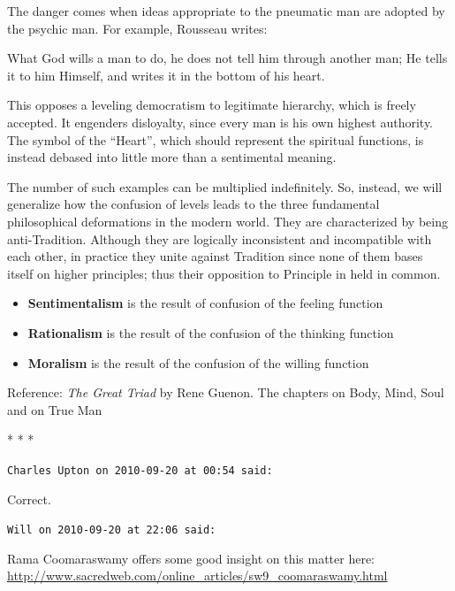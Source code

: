 The danger comes when ideas appropriate to the pneumatic man are adopted by the psychic man. For example, Rousseau writes:

\begin{quotex}
What God wills a man to do, he does not tell him through another man; He tells it to him Himself, and writes it in the bottom of his heart.
\end{quotex}


This opposes a leveling democratism to legitimate hierarchy, which is freely accepted. It engenders disloyalty, since every man is his own highest authority. The symbol of the ``Heart'', which should represent the spiritual functions, is instead debased into little more than a sentimental meaning.

The number of such examples can be multiplied indefinitely. So, instead, we will generalize how the confusion of levels leads to the three fundamental philosophical deformations in the modern world. They are characterized by being anti-Tradition. Although they are logically inconsistent and incompatible with each other, in practice they unite against Tradition since none of them bases itself on higher principles; thus their opposition to Principle in held in common.

\begin{itemize}
\item \textbf{Sentimentalism} is the result of confusion of the feeling function
\item \textbf{Rationalism} is the result of the confusion of the thinking function
\item \textbf{Moralism} is the result of the confusion of the willing function
\end{itemize}

Reference: \emph{The Great Triad} by Rene Guenon. The chapters on Body, Mind, Soul and on True Man



\begin{center}* * *\end{center}

\begin{footnotesize}
\begin{sffamily}
\texttt{Charles Upton on 2010-09-20 at 00:54 said:}

Correct.

\hfill

\texttt{Will on 2010-09-20 at 22:06 said:}

Rama Coomaraswamy offers some good insight on this matter here:
\url{http://www.sacredweb.com/online\_articles/sw9\_coomaraswamy.html}



\hfill

\end{sffamily}
\end{footnotesize}

